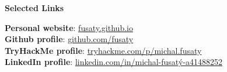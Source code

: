 \documentclass[12pt]{article}
\begin{document}
\vspace{8pt} %

\begin{center}
	{\noindent \bfseries Selected Links}
\end{center} 

\vspace{0.1pt}

\noindent
{\bfseries Personal website}:
\href{https://fusaty.github.io/}{fusaty.github.io} \\[0.04in]
{\bfseries Github profile}: \href{https://github.com/fusaty}{github.com/fusaty} \\[0.04in]
{\bfseries TryHackMe profile}: \href{https://tryhackme.com/p/michal.fusaty}{tryhackme.com/p/michal.fusaty} \\[0.04in]
{\bfseries LinkedIn profile}: \href{https://linkedin.com/in/michal-fusatý-a41488252}{linkedin.com/in/michal-fusatý-a41488252} \\[0.04in]











\end{document}
